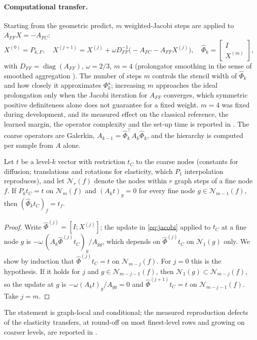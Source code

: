 \paragraph{Computational transfer.} Starting from the geometric predict, $m$ weighted-Jacobi steps are applied to
$A_{FF}X = -A_{FC}$:
\begin{equation}\label{eq:jacobi}
  X^{(0)} = P_{k,F}, \quad X^{(j+1)} = X^{(j)} + \omega D_{FF}^{-1}\big(-A_{FC} - A_{FF}X^{(j)}\big), \quad
  \widehat\Phi_k = \begin{bmatrix} I\\ X^{(m)}\end{bmatrix},
\end{equation}
with $D_{FF} = \operatorname{diag}(A_{FF})$, $\omega = 2/3$, $m = 4$ (prolongator smoothing in the sense of smoothed
aggregation \cite{vanek1996}). The number of steps $m$ controls the stencil width of $\widehat\Phi_k$ and how closely it
approximates $\Phi_k^\star$; increasing $m$ approaches the ideal prolongation only when the Jacobi iteration for $A_{FF}$
converges, which symmetric positive definiteness alone does not guarantee for a fixed weight. $m = 4$ was fixed during
development, and its measured effect on the classical reference, the learned margin, the operator complexity and the set-up
time is reported in . The coarse operators are Galerkin, $A_{k-1} = \widehat\Phi_k^{\!\top} A_k\widehat\Phi_k$,
and the hierarchy is computed per sample from $A$ alone.
\begin{proposition}\label{prop:constants}
Let $t$ be a level-$k$ vector with restriction $t_C$ to the coarse nodes (constants for diffusion; translations and
rotations for elasticity, which $P_1$ interpolation reproduces), and let $\mathcal{N}_r(f)$ denote the nodes within $r$
graph steps of a fine node $f$. If $P_k t_C = t$ on $\mathcal{N}_m(f)$ and $(A_k t)_g = 0$ for every fine node
$g\in\mathcal{N}_{m-1}(f)$, then $(\widehat\Phi_k t_C)_f = t_f$.
\end{proposition}
\begin{proof}
Write $\widehat\Phi^{(j)} = [I;X^{(j)}]$; the update in \eqref{eq:jacobi} applied to $t_C$ at a fine node $g$ is
$-\omega\,(A_k\widehat\Phi^{(j)}t_C)_g/A_{gg}$, which depends on $\widehat\Phi^{(j)}t_C$ on $\mathcal{N}_1(g)$ only. We
show by induction that $\widehat\Phi^{(j)}t_C = t$ on $\mathcal{N}_{m-j}(f)$. For $j = 0$ this is the hypothesis. If it
holds for $j$ and $g\in\mathcal{N}_{m-j-1}(f)$, then $\mathcal{N}_1(g)\subset\mathcal{N}_{m-j}(f)$, so the update at $g$ is
$-\omega(A_kt)_g/A_{gg} = 0$ and $\widehat\Phi^{(j+1)}t_C = t$ on $\mathcal{N}_{m-j-1}(f)$. Take $j = m$.
\end{proof}
The statement is graph-local and conditional; the measured reproduction defects of the elasticity transfers, at round-off
on most finest-level rows and growing on coarser levels, are reported in .

